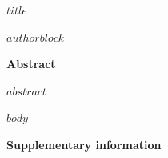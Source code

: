\documentclass[11pt,a4paper]{article}
\begin{document}
\begin{center}
{\LARGE\bfseries $title$\par}
\vspace{.8em}
$authorblock$
\end{center}
\vspace{.6em}
\noindent\textbf{Abstract}\par
$abstract$
\par
\vspace{.6em}
$body$
\FloatBarrier
\clearpage


\clearpage
\begin{center}\Large\bfseries Supplementary information\end{center}
\setcounter{section}{0}
\setcounter{figure}{0}
\renewcommand{\thefigure}{S\arabic{figure}}
\appendix

\end{document}
